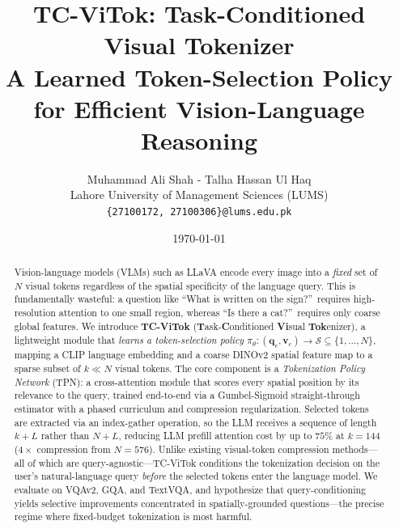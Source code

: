 \documentclass[11pt,a4paper]{article}
\newcommand{\vc}{\mathbf{v}_c}
\newcommand{\qe}{\mathbf{q}_e}
\begin{document}

\title{
  \textbf{TC-ViTok: Task-Conditioned Visual Tokenizer} \\[0.3em]
  \large A Learned Token-Selection Policy for Efficient Vision-Language Reasoning
}

\author{
  Muhammad Ali Shah - Talha Hassan Ul Haq \\[0.3em]
  Lahore University of Management Sciences (LUMS) \\
  \texttt{\{27100172, 27100306\}@lums.edu.pk}
}

\date{\today}

\maketitle
\thispagestyle{empty}

\begin{abstract}

Vision-language models (VLMs) such as LLaVA encode every image into a
\emph{fixed} set of $N$ visual tokens regardless of the spatial specificity
of the language query.
This is fundamentally wasteful: a question like ``What is written on the
sign?''\ requires high-resolution attention to one small region, whereas ``Is
there a cat?''\ requires only coarse global features.
We introduce \textbf{TC-ViTok} (\textbf{T}ask-\textbf{C}onditioned
\textbf{Vi}sual \textbf{Tok}enizer), a lightweight module that \emph{learns
a token-selection policy}
$\pi_\theta\colon (\qe, \vc) \to \mathcal{S} \subseteq \{1,\ldots,N\}$,
mapping a CLIP language embedding and a coarse DINOv2 spatial feature map to a
sparse subset of $k \ll N$ visual tokens.
The core component is a \emph{Tokenization Policy Network} (TPN): a
cross-attention module that scores every spatial position by its
relevance to the query, trained end-to-end via a Gumbel-Sigmoid
straight-through estimator with a phased curriculum and compression
regularization.
Selected tokens are extracted via an index-gather operation, so the LLM
receives a sequence of length $k + L$ rather than $N + L$, reducing
LLM prefill attention cost by up to $75\%$ at $k{=}144$ ($4\times$
compression from $N{=}576$).
Unlike existing visual-token compression methods---all of which are
query-agnostic---TC-ViTok conditions the tokenization decision on the user's
natural-language query \emph{before} the selected tokens enter the language
model.
We evaluate on VQAv2, GQA, and TextVQA, and hypothesize that
query-conditioning yields selective improvements concentrated in
spatially-grounded questions---the precise regime where fixed-budget
tokenization is most harmful.

\end{abstract}
\end{document}
